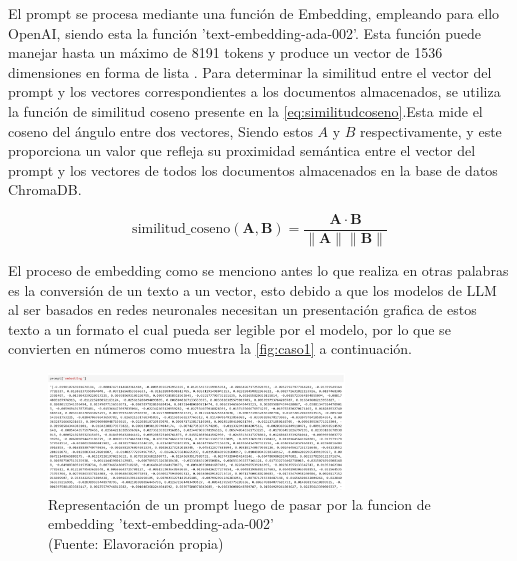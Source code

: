 
El prompt se procesa mediante una función de Embedding, empleando para ello OpenAI, siendo esta  
la función 'text-embedding-ada-002'. Esta función puede manejar hasta un máximo de 8191 tokens y 
produce un vector de 1536 dimensiones en forma de lista \cite{openai1}. Para determinar la similitud entre el 
vector del prompt y los vectores correspondientes a los documentos almacenados, se utiliza la función 
de similitud coseno presente en la \autoref{eq:similitudcoseno}.Esta mide el coseno del ángulo entre dos vectores,
Siendo estos $A$ y $B$ respectivamente, y este proporciona un valor que refleja su proximidad semántica entre el vector
del prompt y los vectores de todos los documentos almacenados en la base de datos ChromaDB.

\begin{equation}
    \text{similitud\_coseno}(\mathbf{A}, \mathbf{B}) = \frac{\mathbf{A} \cdot \mathbf{B}}{\|\mathbf{A}\| \|\mathbf{B}\|}
    \label{eq:similitudcoseno}
\end{equation}


El proceso de embedding como se menciono antes lo que realiza en otras palabras es la conversión de un texto a un vector, esto debido a que los modelos de LLM al ser basados 
en redes neuronales necesitan un presentación grafica de estos texto a un formato el cual pueda ser legible por el modelo, por lo que se convierten en números como muestra la 
\autoref{fig:caso1} a continuación.

\begin{figure}[ht!]
    \centering
    \includegraphics[width=0.7\textwidth]{figures/embedding1.png}
    \caption[Representación vectorial de un prompt luego de pasar por la funcion de embedding]{Representación de un prompt luego de pasar por la funcion de embedding 'text-embedding-ada-002'\\
    {\scriptsize (Fuente: Elavoración propia)}}
    \label{fig:caso1}
\end{figure}


